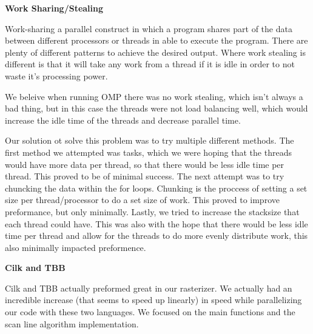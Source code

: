 \begin{center}
    \Large\textbf{Work Sharing/Stealing}\\
\end{center}
    Work-sharing a parallel construct in which a program shares part of the data between different processors or threads in able to execute the program. There are plenty of different patterns to achieve the desired output. Where work stealing is different is that it will take any work from a thread if it is idle in order to not waste it's processing power. 

    We beleive when running OMP there was no work stealing, which isn't always a bad thing, but in this case the threads were not load balancing well, which would increase the idle time of the threads and decrease parallel time.

    Our solution ot solve this problem was to try multiple different methods. The first method we attempted was tasks, which we were hoping that the threads would have more data per thread, so that there would be less idle time per thread. This proved to be of minimal success. The next attempt was to try chuncking the data within the for loops. Chunking is the proccess of setting a set size per thread/processor to do a set size of work. This proved to improve preformance, but only minimally. Lastly, we tried to increase the stacksize that each thread could have. This was also with the hope that there would be less idle time per thread and allow for the threads to do more evenly distribute work, this also minimally impacted preformence. 

\begin{center}
    \Large\textbf{Cilk and TBB}\\
\end{center}

    Cilk and TBB actually preformed great in our rasterizer. We actually had an incredible increase (that seems to speed up linearly) in speed while parallelizing our code with these two languages. We focused on the main functions and the scan line algorithm implementation. 
    
